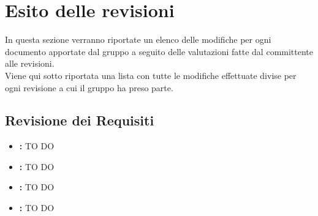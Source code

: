 \pagebreak

\section{Esito delle revisioni}
In questa sezione verranno riportate un elenco delle modifiche per ogni documento apportate dal gruppo a seguito delle valutazioni fatte dal committente alle revisioni.\\
Viene qui sotto riportata una lista con tutte le modifiche effettuate divise per ogni revisione a cui il gruppo ha preso parte.

	\subsection{Revisione dei Requisiti}
	\begin{itemize}
		\item \textbf{\docNameAdR:} TO DO
		\item \textbf{\docNameNdP:} TO DO
		\item \textbf{\docNamePdP:} TO DO
		\item \textbf{\docNamePdQ:} TO DO
	\end{itemize}

\pagebreak